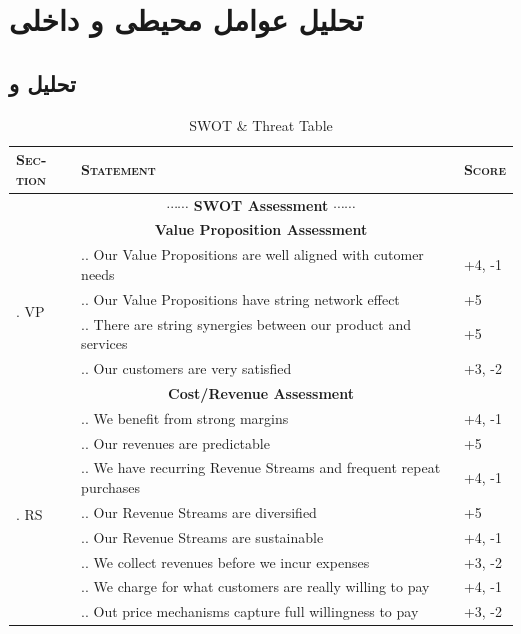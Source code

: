 \documentclass[dvipsnames, svgnames, x11names, 11pt]{article}
\newcounter{secq}
\newcommand{\seccnt}{\stepcounter{secq}\arabic{secq}. }
\newcounter{swotq}[secq]
\newcommand{\swotqcnt}{\stepcounter{swotq}\arabic{secq}.\arabic{swotq}. }
\begin{document}
\section{تحلیل عوامل محیطی و داخلی}
\subsection{تحلیل  و }
\begin{latin}
\begin{center}
\begin{longtable}{p{}|p{}|p{}}
\caption{SWOT \& Threat Table}\\
\textsc{Section} & \textsc{Statement} & \textsc{Score} \\
\hline
\hline
\multicolumn{3}{c}{\textbf{{\large $\cdots\cdots$ SWOT Assessment $\cdots\cdots$}}} \\
\hline
\hline
\hline
\hline
\multicolumn{3}{c}{\textbf{Value Proposition Assessment}} \\
\hline
\hline
\multirow{4}{*}{\seccnt VP}
& \swotqcnt Our Value Propositions are well aligned with cutomer needs
& +4, -1 \\ \cline{2-3}
& \swotqcnt Our Value Propositions have string network effect
& +5 \\ \cline{2-3}
& \swotqcnt There are string synergies between our product and services
& +5 \\ \cline{2-3}
& \swotqcnt Our customers are very satisfied
& +3, -2 \\
\hline
\hline
\multicolumn{3}{c}{\textbf{Cost/Revenue Assessment}} \\
\hline
\hline
\multirow{8}{*}{\seccnt RS}
& \swotqcnt We benefit from strong margins
& +4, -1\\ \cline{2-3}
& \swotqcnt Our revenues are predictable
& +5\\ \cline{2-3}
& \swotqcnt We have recurring Revenue Streams and frequent repeat purchases
& +4, -1\\ \cline{2-3}
& \swotqcnt Our Revenue Streams are diversified
& +5\\ \cline{2-3}
& \swotqcnt Our Revenue Streams are sustainable
& +4, -1\\ \cline{2-3}
& \swotqcnt We collect revenues before we incur expenses
& +3, -2\\ \cline{2-3}
& \swotqcnt We charge for what customers are really willing to pay
& +4, -1\\ \cline{2-3}
& \swotqcnt Out price mechanisms capture full willingness to pay
& +3, -2\\ \hline


\end{longtable}
\end{center}
\end{latin}
\end{document}
